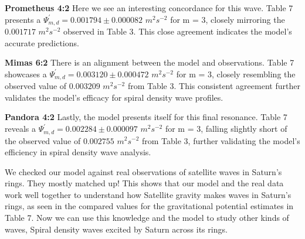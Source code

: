 \documentclass{article}
\begin{document}
\textbf{Prometheus 4:2}
Here we see an interesting concordance for this wave. Table 7 presents a $\Psi_{m,d}^{'} = 0.001794 \pm 0.000082$ $m^{2}s^{-2}$ for m = 3, closely mirroring the $0.001717$ $m^{2}s^{-2}$ observed in Table 3. This close agreement indicates the model's accurate predictions.

\textbf{Mimas 6:2}
 There is an alignment between the model and observations. Table 7 showcases a $\Psi_{m,d}^{'} = 0.003120 \pm 0.000472$ $m^{2}s^{-2}$ for m = 3, closely resembling the observed value of $0.003209$ $m^{2}s^{-2}$ from Table 3. This consistent agreement further validates the model's efficacy for spiral density wave profiles.

\textbf{Pandora 4:2}
Lastly, the model presents itself for this final resonance. Table 7 reveals a $\Psi_{m,d}^{'} = 0.002284 \pm 0.000097$ $m^{2}s^{-2}$ for m = 3, falling slightly short of the observed value of $0.002755$ $m^{2}s^{-2}$ from Table 3, further validating the model's efficiency in spiral density wave analysis.

We checked our model against real observations of satellite waves in Saturn's rings. They mostly matched up! This shows that our model and the real data work well together to understand how Satellite gravity makes waves in Saturn's rings, as seen in the compared values for the gravitational potential estimates in Table 7. Now we can use this knowledge and the model to study other kinds of waves, Spiral density waves excited by Saturn across its rings.

\begin{table}
\centering
{}
\caption{Estimates of Gravitational potential from theoretical model for spiral density waves excited by Saturn's Satellite resonances.}
\end{table}
\end{document}
